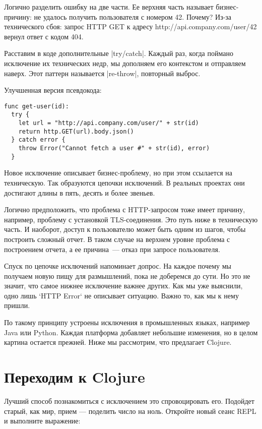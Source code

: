 Логично разделить ошибку на две части. Ее верхняя часть называет бизнес-причину:
не удалось получить пользователя с номером 42. Почему? Из-за технического сбоя:
запрос HTTP GET к адресу http://api.company.com/user/42 вернул ответ с кодом
404.

Расставим в коде дополнительные \spverb|try/catch|. Каждый раз, когда поймано
исключение их технических недр, мы дополняем его контекстом и отправляем
наверх. Этот паттерн называется \spverb|re-throw|, повторный выброс.

Улучшенная версия псевдокода:

\begin{verbatim}
func get-user(id):
  try {
    let url = "http://api.company.com/user/" + str(id)
    return http.GET(url).body.json()
  } catch error {
    throw Error("Cannot fetch a user #" + str(id), error)
  }
\end{verbatim}

Новое исключение описывает бизнес-проблему, но при этом ссылается на
техническую. Так образуются цепочки исключений. В реальных проектах они
достигают длины в пять, десять и более звеньев.

Логично предположить, что проблема с HTTP-запросом тоже имеет причину, например,
проблему с установкой TLS-соединения. Это путь ниже в техническую часть. И
наоборот, доступ к пользователю может быть одним из шагов, чтобы построить
сложный отчет. В таком случае на верхнем уровне проблема с построением отчета, а
ее причина~--- отказ при запросе пользователя.

Спуск по цепочке исключений напоминает допрос. На каждое почему мы получаем
новую пищу для размышлений, пока не доберемся до сути. Но это не значит, что
самое нижнее исключение важнее других. Как мы уже выяснили, одно лишь `HTTP
Error` не описывает ситуацию. Важно то, как мы к нему пришли.

По такому принципу устроены исключения в промышленных языках, например Java или
Python. Каждая платформа добавляет небольшие изменения, но в целом картина
остается прежней. Ниже мы рассмотрим, что предлагает Clojure.

\section{Переходим к Clojure}

Лучший способ познакомиться с исключением это спровоцировать его. Подойдет
старый, как мир, прием — поделить число на ноль. Откройте новый сеанс REPL и
выполните выражение:


